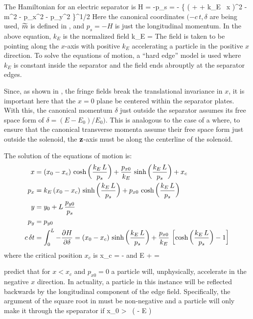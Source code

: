The Hamiltonian for an electric separator is 
\Begineq
  H = -p_s 
  = - \left\{ \left(  + \delta + k_E \, x \right)^2 - 
  \wt m^2 - p_x^2 - p_y^2 \right\}^{1/2}
  \label{hp1b}
\Endeq
Here the canonical coordinates $(-c \, t, \delta$ are being used,
$\widetilde m$ is defined in , and $p_s = -H$ is just the
longitudinal momentum.  In the above equation, $k_E$ is the normalized
field
\Begineq
  k_E = 
\Endeq
The field is taken to be pointing along the $x$-axis with positive
$k_E$ accelerating a particle in the positive $x$ direction. To solve
the equations of motion, a ``hard edge'' model is used where $k_E$ is
constant inside the separator and the field ends abrouptly at the
separator edges.

Since, as shown in , the fringe fields break the
translational invariance in $x$, it is important here that the $x = 0$
plane be centered within the separator plates. With this, the
canonical momentum $\delta$ just outside the separator assumes its
free space form of $\delta = (E - E_0) / E_0)$. This is analogous to
the case of a  where, to ensure that the canonical
transverse momenta assume their free space form just outside the
solenoid, the ${\bf z}$-axis must be along the centerline of the
solenoid.

The solution of the equations of motion is:
\begin{align}
  x   &= (x_0 - x_c) \, \cosh \left( \frac{k_E \, L}{p_s} \right) + 
         \frac{p_{x0}}{k_E} \, \sinh \left( \frac{k_E \, L}{p_s} \right) + x_c \nonumber \\
  p_x &= k_E \, (x_0 - x_c) \, \sinh \left( \frac{k_E \, L}{p_s} \right) + 
         {p_{x0}} \, \cosh \left( \frac{k_E \, L}{p_s} \right) \nonumber \\
  y   &= y_0 + L \, \frac{p_{y0}}{p_s} \label{xxlp} \\
  p_y &= p_{y0} \nonumber \\
  c \, \delta t &=  \int_0^L -\frac{\partial H}{\partial \delta}
      = (x_0 - x_c) \, \sinh \left( \frac{k_E \, L}{p_s} \right) +
        \frac{p_{x0}}{k_E} \, \left[ \cosh \left( \frac{k_E \, L}{p_s} \right) - 1 \right]
        \nonumber
\end{align}
where the critical position $x_c$ is
\Begineq 
  x_c = -
\Endeq
and 
\Begineq
  \wt E \equiv {} + \delta = 
\Endeq
 
 predict that for $x < x_c$ and $p_{x0} = 0$ a particle
will, unphysically, accelerate in the negative $x$ direction. In
actuality, a particle in this instance will be reflected backwards by
the longitudinal component of the edge field. Specifically, the
argument of the square root in  must be non-negative and
a particle will only make it through the speparator if
\Begineq
  x_0 >  \, \left(  - \wt E \right)
\Endeq

